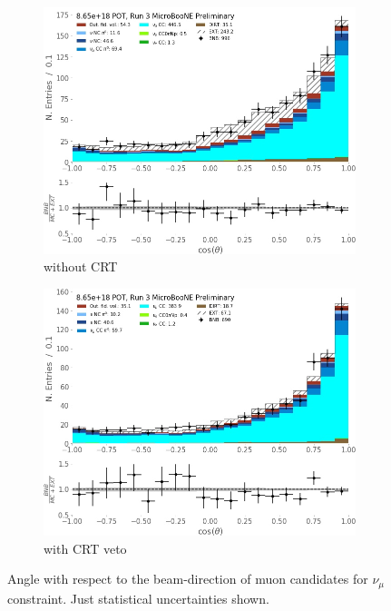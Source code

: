 \begin{figure}[ht] 
\begin{center}
    \begin{subfigure}[b]{0.45\textwidth}
    \centering
    \includegraphics[width=1.00\textwidth]{NuMuCCsel/Images/Ryan/Run3_costheta_noCRT.jpg}
    \caption{\label{fig:NuMUCCsel:ryan:coswithCRT} without CRT}
    \end{subfigure}
    \begin{subfigure}[b]{0.45\textwidth}
    \centering
    \includegraphics[width=1.00\textwidth]{NuMuCCsel/Images/Ryan/Run3_costheta_withCRT.jpg}
    \caption{\label{fig:NuMUCCsel:ryan:cosnoCRT} with CRT veto}
    \end{subfigure}
\caption{Angle with respect to the beam-direction of muon candidates for $\nu_{\mu}$ constraint. Just statistical uncertainties shown.}
\label{fig:NuMUCCsel:ryan:Run3CRTcomp}
\end{center}
\end{figure}

